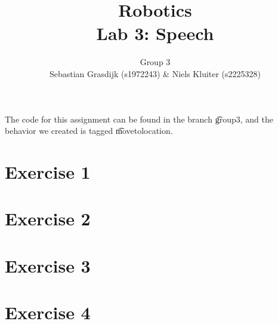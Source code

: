 \documentclass[a4paper]{article}
\title{Robotics\\ Lab 3: Speech}
\author{Group 3\\Sebastian Grasdijk (s1972243) \& Niels Kluiter (s2225328)}
\begin{document}
\maketitle

\noindent The code for this assignment can be found in the branch \t{group3}, and the behavior we created is tagged \t{movetolocation}.

\section*{Exercise 1}


\section*{Exercise 2}


\section*{Exercise 3}


\section*{Exercise 4}


\printbibliography

\clearpage
\appendix

\end{document}
